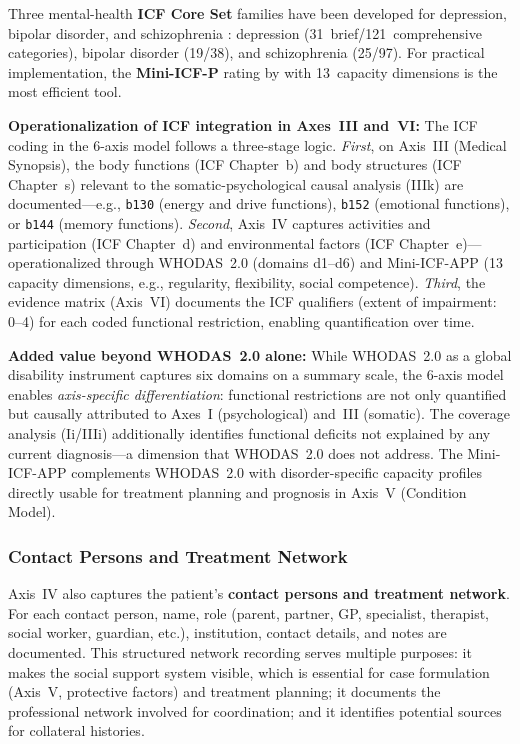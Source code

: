 \documentclass[11pt,a4paper]{article}
\begin{document}
Three mental-health \textbf{ICF Core Set} families have been developed for depression, bipolar disorder, and schizophrenia \citep{Cieza2004Depression, AyusoMateos2013Bipolar, GomezBenito2018Schizophrenia}: depression (31~brief/121~comprehensive categories), bipolar disorder (19/38), and schizophrenia (25/97). For practical implementation, the \textbf{Mini-ICF-P} rating by \citet{LindenBaron2005} with 13~capacity dimensions is the most efficient tool.

\textbf{Operationalization of ICF integration in Axes~III and~VI:} The ICF coding in the 6-axis model follows a three-stage logic. \textit{First}, on Axis~III (Medical Synopsis), the body functions (ICF Chapter~b) and body structures (ICF Chapter~s) relevant to the somatic-psychological causal analysis (IIIk) are documented---e.g., \texttt{b130} (energy and drive functions), \texttt{b152} (emotional functions), or \texttt{b144} (memory functions). \textit{Second}, Axis~IV captures activities and participation (ICF Chapter~d) and environmental factors (ICF Chapter~e)---operationalized through WHODAS~2.0 (domains d1--d6) and Mini-ICF-APP (13 capacity dimensions, e.g., regularity, flexibility, social competence). \textit{Third}, the evidence matrix (Axis~VI) documents the ICF qualifiers (extent of impairment: 0--4) for each coded functional restriction, enabling quantification over time.

\textbf{Added value beyond WHODAS~2.0 alone:} While WHODAS~2.0 as a global disability instrument captures six domains on a summary scale, the 6-axis model enables \textit{axis-specific differentiation}: functional restrictions are not only quantified but causally attributed to Axes~I (psychological) and~III (somatic). The coverage analysis (Ii/IIIi) additionally identifies functional deficits not explained by any current diagnosis---a dimension that WHODAS~2.0 does not address. The Mini-ICF-APP complements WHODAS~2.0 with disorder-specific capacity profiles directly usable for treatment planning and prognosis in Axis~V (Condition Model).

\subsubsection{Contact Persons and Treatment Network}

Axis~IV also captures the patient's \textbf{contact persons and treatment network}. For each contact person, name, role (parent, partner, GP, specialist, therapist, social worker, guardian, etc.), institution, contact details, and notes are documented. This structured network recording serves multiple purposes: it makes the social support system visible, which is essential for case formulation (Axis~V, protective factors) and treatment planning; it documents the professional network involved for coordination; and it identifies potential sources for collateral histories.
\end{document}
